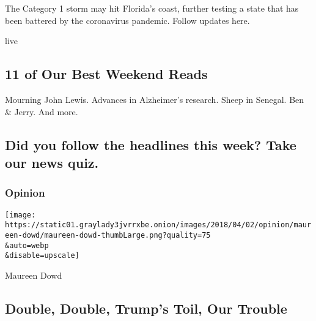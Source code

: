 \href{/2020/08/01/us/hurricane-isaias-track.html}{}

The Category 1 storm may hit Florida's coast, further testing a state
that has been battered by the coronavirus pandemic. Follow updates here.

live

\href{/2020/07/31/briefing/11-of-our-best-weekend-reads.html}{}

\hypertarget{11-of-our-best-weekend-reads}{%
\subsection{11 of Our Best Weekend
Reads}\label{11-of-our-best-weekend-reads}}

Mourning John Lewis. Advances in Alzheimer's research. Sheep in Senegal.
Ben \& Jerry. And more.

\href{/2020/07/31/briefing/11-of-our-best-weekend-reads.html}{}

\href{/interactive/2020/07/31/briefing/troops-baseball-louie-gohmert-news-quiz.html}{}

\hypertarget{did-you-follow-the-headlines-this-week-take-our-news-quiz}{%
\subsection{Did you follow the headlines this week? Take our news
quiz.}\label{did-you-follow-the-headlines-this-week-take-our-news-quiz}}

\href{https://www.nytimes3xbfgragh.onion/section/opinion?pagetype=Homepage\&action=click\&module=Opinion}{}

\hypertarget{opinion}{%
\subsubsection{Opinion}\label{opinion}}

\href{/2020/08/01/opinion/columnists/trump-coronavirus-herman-cain.html}{}

\texttt{[image: https://static01.graylady3jvrrxbe.onion/images/2018/04/02/opinion/maureen-dowd/maureen-dowd-thumbLarge.png?quality=75\\\&auto=webp\\\&disable=upscale]}

Maureen Dowd

\hypertarget{double-double-trumps-toil-our-trouble}{%
\subsection{Double, Double, Trump's Toil, Our
Trouble}\label{double-double-trumps-toil-our-trouble}}

